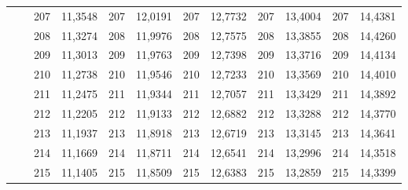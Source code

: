 \documentclass[a4paper,12pt]{article} %
\begin{document}
\begin{longtable}[c]{cccccccccc|c|c|}
	& \multicolumn{1}{c|}{} & \multicolumn{1}{c|}{207} & \multicolumn{1}{c|}{11,3548} & \multicolumn{1}{c|}{207} & \multicolumn{1}{c|}{12,0191} & \multicolumn{1}{c|}{207} & \multicolumn{1}{c|}{12,7732} & \multicolumn{1}{c|}{207} & 13,4004 & 207 & 14,4381 \\ \cline{3-12} 
	& \multicolumn{1}{c|}{} & \multicolumn{1}{c|}{208} & \multicolumn{1}{c|}{11,3274} & \multicolumn{1}{c|}{208} & \multicolumn{1}{c|}{11,9976} & \multicolumn{1}{c|}{208} & \multicolumn{1}{c|}{12,7575} & \multicolumn{1}{c|}{208} & 13,3855 & 208 & 14,4260 \\ \cline{3-12} 
	& \multicolumn{1}{c|}{} & \multicolumn{1}{c|}{209} & \multicolumn{1}{c|}{11,3013} & \multicolumn{1}{c|}{209} & \multicolumn{1}{c|}{11,9763} & \multicolumn{1}{c|}{209} & \multicolumn{1}{c|}{12,7398} & \multicolumn{1}{c|}{209} & 13,3716 & 209 & 14,4134 \\ \cline{3-12} 
	& \multicolumn{1}{c|}{} & \multicolumn{1}{c|}{210} & \multicolumn{1}{c|}{11,2738} & \multicolumn{1}{c|}{210} & \multicolumn{1}{c|}{11,9546} & \multicolumn{1}{c|}{210} & \multicolumn{1}{c|}{12,7233} & \multicolumn{1}{c|}{210} & 13,3569 & 210 & 14,4010 \\ \cline{3-12} 
	& \multicolumn{1}{c|}{} & \multicolumn{1}{c|}{211} & \multicolumn{1}{c|}{11,2475} & \multicolumn{1}{c|}{211} & \multicolumn{1}{c|}{11,9344} & \multicolumn{1}{c|}{211} & \multicolumn{1}{c|}{12,7057} & \multicolumn{1}{c|}{211} & 13,3429 & 211 & 14,3892 \\ \cline{3-12} 
	& \multicolumn{1}{c|}{} & \multicolumn{1}{c|}{212} & \multicolumn{1}{c|}{11,2205} & \multicolumn{1}{c|}{212} & \multicolumn{1}{c|}{11,9133} & \multicolumn{1}{c|}{212} & \multicolumn{1}{c|}{12,6882} & \multicolumn{1}{c|}{212} & 13,3288 & 212 & 14,3770 \\ \cline{3-12} 
	& \multicolumn{1}{c|}{} & \multicolumn{1}{c|}{213} & \multicolumn{1}{c|}{11,1937} & \multicolumn{1}{c|}{213} & \multicolumn{1}{c|}{11,8918} & \multicolumn{1}{c|}{213} & \multicolumn{1}{c|}{12,6719} & \multicolumn{1}{c|}{213} & 13,3145 & 213 & 14,3641 \\ \cline{3-12} 
	& \multicolumn{1}{c|}{} & \multicolumn{1}{c|}{214} & \multicolumn{1}{c|}{11,1669} & \multicolumn{1}{c|}{214} & \multicolumn{1}{c|}{11,8711} & \multicolumn{1}{c|}{214} & \multicolumn{1}{c|}{12,6541} & \multicolumn{1}{c|}{214} & 13,2996 & 214 & 14,3518 \\ \cline{3-12} 
	& \multicolumn{1}{c|}{} & \multicolumn{1}{c|}{215} & \multicolumn{1}{c|}{11,1405} & \multicolumn{1}{c|}{215} & \multicolumn{1}{c|}{11,8509} & \multicolumn{1}{c|}{215} & \multicolumn{1}{c|}{12,6383} & \multicolumn{1}{c|}{215} & 13,2859 & 215 & 14,3399 \\ \cline{3-12} 

\end{longtable}
\end{document}
